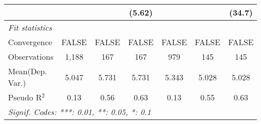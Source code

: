 \begin{tabular}{lcccccc}
                           &       &           & (5.62)        &       &               & (34.7)\\   
   \midrule
   \emph{Fit statistics}\\
   Convergence             &FALSE  & FALSE     & FALSE         & FALSE & FALSE         & FALSE\\  
   Observations            & 1,188 & 167       & 167           & 979   & 145           & 145\\  
Mean(Dep. Var.) & 5.047 & 5.731 & 5.731 & 5.343 & 5.028 & 5.028 \\
   Pseudo R$^2$            & 0.13  & 0.56      & 0.63          & 0.13  & 0.55          & 0.63\\  
   \midrule \midrule
   \multicolumn{7}{l}{\emph{Signif. Codes: ***: 0.01, **: 0.05, *: 0.1}}\\
\end{tabular}
\par\endgroup
